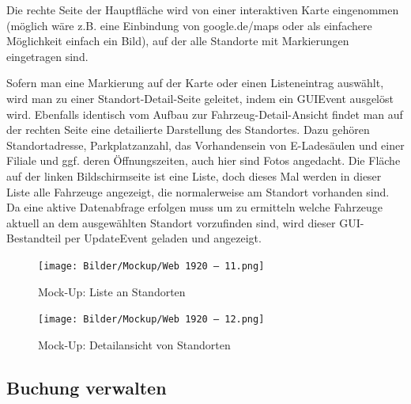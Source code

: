 Die rechte Seite der Hauptfläche wird von einer interaktiven Karte eingenommen (möglich wäre z.B. eine Einbindung von google.de/maps oder als einfachere Möglichkeit einfach ein Bild), auf der alle Standorte mit Markierungen eingetragen sind. 


Sofern man eine Markierung auf der Karte oder einen Listeneintrag auswählt, wird man zu einer Standort-Detail-Seite geleitet, indem ein GUIEvent ausgelöst wird.  
Ebenfalls identisch vom Aufbau zur Fahrzeug-Detail-Ansicht findet man auf der rechten Seite eine detailierte Darstellung des Standortes. Dazu gehören Standortadresse, Parkplatzanzahl, das Vorhandensein von E-Ladesäulen und einer Filiale und ggf. deren Öffnungszeiten, auch hier sind Fotos angedacht. 
Die Fläche auf der linken Bildschirmseite ist eine Liste, doch dieses Mal werden in dieser Liste alle Fahrzeuge angezeigt, die normalerweise am Standort vorhanden sind.
Da eine aktive Datenabfrage erfolgen muss um zu ermitteln welche Fahrzeuge aktuell an dem ausgewählten Standort vorzufinden sind, wird dieser GUI-Bestandteil per UpdateEvent geladen und angezeigt.

\begin{figure}[!ht]
    \centering
    \texttt{[image: Bilder/Mockup/Web 1920 – 11.png]}
    \caption{Mock-Up: Liste an Standorten}
    \label{mu:standortliste}
\end{figure}  

\begin{figure}[!ht]
    \centering
    \texttt{[image: Bilder/Mockup/Web 1920 – 12.png]}
    \caption{Mock-Up: Detailansicht von Standorten}
    \label{mu:standortdetails}
\end{figure}

\newpage

\subsection{Buchung verwalten}

